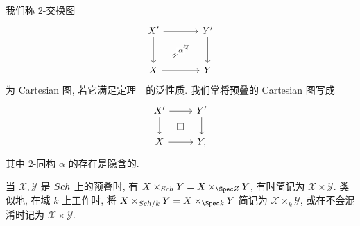 \begin{definition}\label{src:3.4.36}
我们称 $2$-交换图
\[
\begin{tikzcd}[column sep=large,row sep=large]
\mathcal X'\arrow[r]\arrow[d]&\mathcal Y'\arrow[d]\\
\mathcal X\arrow[r]&\mathcal Y
\arrow[Rightarrow,from=2-1,to=1-2,shorten <=1.4em,shorten >=1.4em,"\alpha" description]
\end{tikzcd}
\]
为 Cartesian 图, 若它满足定理~~的泛性质. 我们常将预叠的 Cartesian 图写成
\[
\begin{tikzcd}
\mathcal X'\arrow[r]\arrow[d]\arrow[dr,phantom,"\square"]&
\mathcal Y'\arrow[d]\\
\mathcal X\arrow[r]&\mathcal Y,
\end{tikzcd}
\]
其中 $2$-同构 $\alpha$ 的存在是隐含的.
\end{definition}
当 $\mathcal X,\mathcal Y$ 是 $Sch$ 上的预叠时, 有 $\mathcal X\times_{\Sch}\mathcal Y=\mathcal X\times_{\Spec\mathbb Z}\mathcal Y$, 有时简记为 $\mathcal X\times\mathcal Y$. 类似地, 在域 $k$ 上工作时, 将 $\mathcal X\times_{\Sch/k}\mathcal Y=\mathcal X\times_{\Spec k}\mathcal Y$ 简记为 $\mathcal X\times_k\mathcal Y$, 或在不会混淆时记为 $\mathcal X\times\mathcal Y$.

